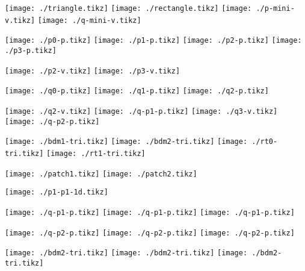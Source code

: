 \documentclass{article}
\begin{document}
\texttt{[image: ./triangle.tikz]}
\texttt{[image: ./rectangle.tikz]}
\texttt{[image: ./p-mini-v.tikz]}
\texttt{[image: ./q-mini-v.tikz]}

\texttt{[image: ./p0-p.tikz]}
\texttt{[image: ./p1-p.tikz]}
\texttt{[image: ./p2-p.tikz]}
\texttt{[image: ./p3-p.tikz]}

\texttt{[image: ./p2-v.tikz]}
\texttt{[image: ./p3-v.tikz]}

\texttt{[image: ./q0-p.tikz]}
\texttt{[image: ./q1-p.tikz]}
\texttt{[image: ./q2-p.tikz]}

\texttt{[image: ./q2-v.tikz]}
\texttt{[image: ./q-p1-p.tikz]}
\texttt{[image: ./q3-v.tikz]}
\texttt{[image: ./q-p2-p.tikz]}

\texttt{[image: ./bdm1-tri.tikz]}
\texttt{[image: ./bdm2-tri.tikz]}
\texttt{[image: ./rt0-tri.tikz]}
\texttt{[image: ./rt1-tri.tikz]}


\texttt{[image: ./patch1.tikz]}
\texttt{[image: ./patch2.tikz]}

\texttt{[image: ./p1-p1-1d.tikz]}

\texttt{[image: ./q-p1-p.tikz]}
\texttt{[image: ./q-p1-p.tikz]}
\texttt{[image: ./q-p1-p.tikz]}

\texttt{[image: ./q-p2-p.tikz]}
\texttt{[image: ./q-p2-p.tikz]}
\texttt{[image: ./q-p2-p.tikz]}

\texttt{[image: ./bdm2-tri.tikz]}
\texttt{[image: ./bdm2-tri.tikz]}
\texttt{[image: ./bdm2-tri.tikz]}
\end{document}
